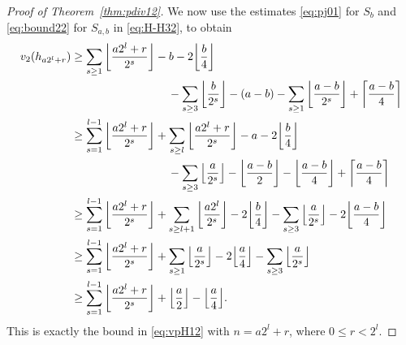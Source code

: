 \documentclass[12pt,reqno]{amsart}
\numberwithin{equation}{section}
\theoremstyle{remark}
\begin{document}
\begin{proof}[Proof of Theorem~{\em \ref{thm:pdiv12}}]
We now use the estimates \eqref{eq:pj01} for $S_b$ and
\eqref{eq:bound22} for $S_{a,b}$ in \eqref{eq:H-H32}, to obtain
{\allowdisplaybreaks
\begin{align}
\notag
v_2(h_{a2^l+r})&\ge 
\sum_{s\ge1}{\left\lfloor{\frac {a2^l+r} {2^{s}}}\right\rfloor}
-b-2{\left\lfloor{\frac {b} {4}}\right\rfloor}\\
\notag
&\kern3cm
-\sum_{s\ge3}{\left\lfloor{\frac {b} {2^s}}\right\rfloor}
-(a-b)
-\sum_{s\ge1}{\left\lfloor{\frac {a-b} {2^{s}}}\right\rfloor}
+{\left\lceil{\frac {a-b} {4}}\right\rceil}\\
\notag
&\ge
\sum_{s=1}^{l-1}{\left\lfloor{\frac {a2^l+r} {2^{s}}}\right\rfloor}
+\sum_{s\ge l}{\left\lfloor{\frac {a2^l+r} {2^{s}}}\right\rfloor}
-a-2{\left\lfloor{\frac {b} {4}}\right\rfloor}\\
\notag
&\kern3cm
-\sum_{s\ge3}{\left\lfloor{\frac {a} {2^s}}\right\rfloor}
-{\left\lfloor{\frac {a-b} {2}}\right\rfloor}
-{\left\lfloor{\frac {a-b} {4}}\right\rfloor}
+{\left\lceil{\frac {a-b} {4}}\right\rceil}\\
\notag
&\ge
\sum_{s=1}^{l-1}{\left\lfloor{\frac {a2^l+r} {2^{s}}}\right\rfloor}
+\sum_{s\ge l+1}{\left\lfloor{\frac {a2^l} {2^{s}}}\right\rfloor}
-2{\left\lfloor{\frac {b} {4}}\right\rfloor}-\sum_{s\ge3}{\left\lfloor{\frac {a} {2^s}}\right\rfloor}
-2{\left\lfloor{\frac {a-b} {4}}\right\rfloor}\\
\notag
&\ge
\sum_{s=1}^{l-1}{\left\lfloor{\frac {a2^l+r} {2^{s}}}\right\rfloor}
+\sum_{s\ge 1}{\left\lfloor{\frac {a} {2^{s}}}\right\rfloor}
-2{\left\lfloor{\frac {a} {4}}\right\rfloor}-\sum_{s\ge3}{\left\lfloor{\frac {a} {2^s}}\right\rfloor}\\
&\ge
\sum_{s=1}^{l-1}{\left\lfloor{\frac {a2^l+r} {2^{s}}}\right\rfloor}
+{\left\lfloor{\frac {a} {2}}\right\rfloor}
-{\left\lfloor{\frac {a} {4}}\right\rfloor}.
\label{eq:a-b}
\end{align}}This is exactly the bound in \eqref{eq:vpH12} with $n=a2^l+r$,
where $0\le r<2^l$.


\end{proof}
\end{document}
